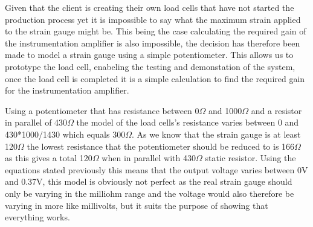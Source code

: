 Given that the client is creating their own load cells that have not started the production process yet it is impossible to say what the maximum strain applied to the strain gauge might be. This being the case calculating the required gain of the instrumentation amplifier is also impossible, the decision has therefore been made to model a strain gauge using a simple potentiometer. This allows us to prototype the load cell, enabeling the testing and demonstation of the system, once the load cell is completed it is a simple calculation to find the required gain for the instrumentation amplifier. 

Using a potentiometer that has resistance between 0\(\Omega\) and 1000\(\Omega\) and a resistor in parallel of 430\(\Omega\) the model of the load cells's resistance varies between 0 and 430*1000/1430 which equals 300\(\Omega\). As we know that the strain gauge is at least 120\(\Omega\) the lowest resistance that the potentiometer should be reduced to is 166\(\Omega\) as this gives a total 120\(\Omega\) when in parallel with 430\(\Omega\) static resistor. Using the equations stated previously this means that the output voltage varies between 0V and 0.37V, this model is obviously not perfect as the real strain gauge should only be varying in the milliohm range and the voltage would also therefore be varying in more like millivolts, but it suits the purpose of showing that everything works. 